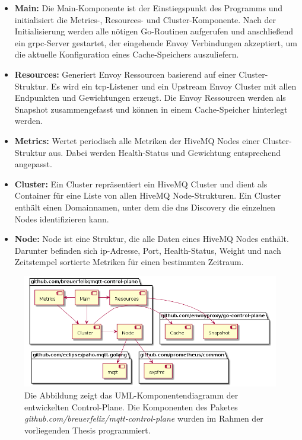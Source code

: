 \begin{itemize}
  \item \textbf{Main:} Die Main-Komponente ist der Einstiegspunkt des Programms und initialisiert die Metrics-, Resources- und Cluster-Komponente. Nach der Initialisierung werden alle nötigen Go-Routinen aufgerufen und anschlie{\ss}end ein g\acs{rpc}-Server gestartet, der eingehende Envoy Verbindungen akzeptiert, um die aktuelle Konfiguration eines Cache-Speichers auszuliefern.
  \item \textbf{Resources:} Generiert Envoy Ressourcen basierend auf einer Cluster-Struktur. Es wird ein \ac{tcp}-Listener und ein Upstream Envoy Cluster mit allen Endpunkten und Gewichtungen erzeugt. Die Envoy Ressourcen werden als Snapshot zusammengefasst und können in einem Cache-Speicher hinterlegt werden.
\newpage
  \item \textbf{Metrics:} Wertet periodisch alle Metriken der HiveMQ Nodes einer Cluster-Struktur aus. Dabei werden Health-Status und Gewichtung entsprechend angepasst.
  \item \textbf{Cluster:} Ein Cluster repräsentiert ein HiveMQ Cluster und dient als Container für eine Liste von allen HiveMQ Node-Strukturen. Ein Cluster enthält einen Domainnamen, unter dem die \ac{dns} Discovery die einzelnen Nodes identifizieren kann.
  \item \textbf{Node:} Node ist eine Struktur, die alle Daten eines HiveMQ Nodes enthält. Darunter befinden sich \ac{ip}-Adresse, Port, Health-Status, Weight und nach Zeitstempel sortierte Metriken für einen bestimmten Zeitraum.
\end{itemize}
\begin{figure}[h]
    \centering
    \includegraphics[scale=0.5]{gen/component-diagram.png}
    \caption{Die Abbildung zeigt das UML-Komponentendiagramm der entwickelten Control-Plane. Die Komponenten des Paketes \textit{github.com/breuerfelix/mqtt-control-plane} wurden im Rahmen der vorliegenden Thesis programmiert.}
    \label{fig:component-diagram}
\end{figure}
